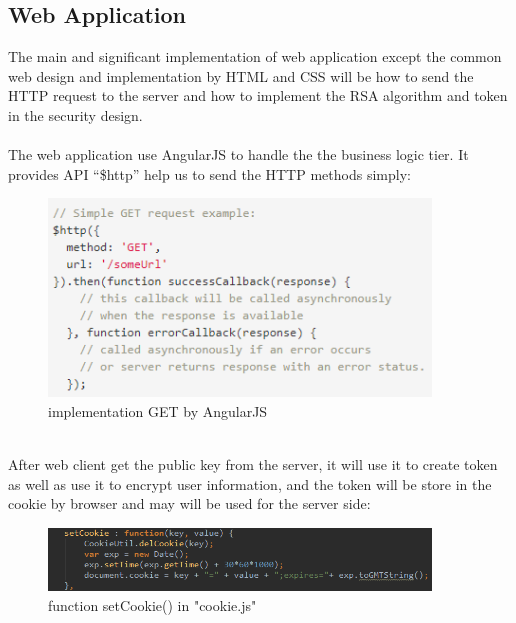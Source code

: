 \documentclass[12pt,a4]{article}
\begin{document}
\subsection{Web Application}\label{4.3}
The main and significant implementation of web application except the common web design and implementation by HTML and CSS will be how to send the HTTP request to the server and how to implement the RSA algorithm and token in the security design.\\\\
The web application use AngularJS to handle the the business logic tier. It provides API “\$http” help us to send the HTTP methods simply:
\begin{figure}[h]%
		\centering  %
		\includegraphics[width=4in]{figure/white}  	%
		\caption{implementation GET by AngularJS}   %
		\end{figure}
\\After web client get the public key from the server, it will use it to create token as well as use it to encrypt user information, and the token will be store in the cookie by browser and may will be used for the server side:
\begin{figure}[h]%
		\centering  %
		\includegraphics[width=4in]{figure/white2}  	%
		\caption{function setCookie() in "cookie.js"}   %
		\end{figure}
\end{document}
